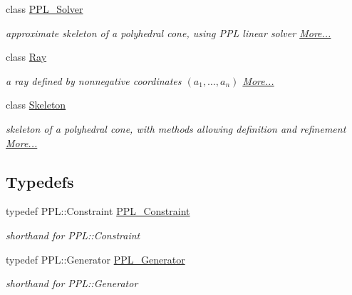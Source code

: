 \begin{DoxyCompactItemize}
class \hyperlink{group___c_l_s_solvers_class_l_p___solvers_1_1_p_p_l___solver}{P\+P\+L\+\_\+\+Solver}
\begin{DoxyCompactList}\small\item\em approximate skeleton of a polyhedral cone, using P\+PL linear solver  \hyperlink{group___c_l_s_solvers_class_l_p___solvers_1_1_p_p_l___solver}{More...}\end{DoxyCompactList}\item 
class \hyperlink{group___c_l_s_solvers_class_l_p___solvers_1_1_ray}{Ray}
\begin{DoxyCompactList}\small\item\em a ray defined by nonnegative coordinates $(a_1,\ldots,a_n)$  \hyperlink{group___c_l_s_solvers_class_l_p___solvers_1_1_ray}{More...}\end{DoxyCompactList}\item 
class \hyperlink{group___c_l_s_solvers_class_l_p___solvers_1_1_skeleton}{Skeleton}
\begin{DoxyCompactList}\small\item\em skeleton of a polyhedral cone, with methods allowing definition and refinement  \hyperlink{group___c_l_s_solvers_class_l_p___solvers_1_1_skeleton}{More...}\end{DoxyCompactList}\end{DoxyCompactItemize}
\subsection*{Typedefs}
\begin{DoxyCompactItemize}
\item 
\mbox{\label{namespace_l_p___solvers_a79355cedbe1e86a93a1d5673b7081f0d}} 
typedef P\+P\+L\+::\+Constraint \hyperlink{namespace_l_p___solvers_a79355cedbe1e86a93a1d5673b7081f0d}{P\+P\+L\+\_\+\+Constraint}
\begin{DoxyCompactList}\small\item\em shorthand for {\ttfamily P\+P\+L\+::\+Constraint} \end{DoxyCompactList}\item 
\mbox{\label{namespace_l_p___solvers_af3683d6db493de447cbed079aa8f8a36}} 
typedef P\+P\+L\+::\+Generator \hyperlink{namespace_l_p___solvers_af3683d6db493de447cbed079aa8f8a36}{P\+P\+L\+\_\+\+Generator}
\begin{DoxyCompactList}\small\item\em shorthand for {\ttfamily P\+P\+L\+::\+Generator} \end{DoxyCompactList}\end{DoxyCompactItemize}
